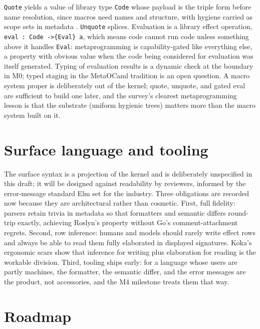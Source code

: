\documentclass[11pt]{article}
\begin{document}
\texttt{Quote} yields a value of library type \texttt{Code} whose payload is the triple form before name resolution, since macros need names and structure, with hygiene carried as scope sets in metadata \cite{flatt2016, kohlbecker1986}. \texttt{Unquote} splices. Evaluation is a library effect operation, \texttt{eval : Code ->\{Eval\} a}, which means code cannot run code unless something above it handles \texttt{Eval}: metaprogramming is capability-gated like everything else, a property with obvious value when the code being considered for evaluation was itself generated. Typing of evaluation results is a dynamic check at the boundary in M0; typed staging in the MetaOCaml tradition is an open question. A macro system proper is deliberately out of the kernel; quote, unquote, and gated eval are sufficient to build one later, and the survey's clearest metaprogramming lesson is that the substrate (uniform hygienic trees) matters more than the macro system built on it.

\section{Surface language and tooling}
\label{sec:tooling}

The surface syntax is a projection of the kernel and is deliberately unspecified in this draft; it will be designed against readability by reviewers, informed by the error-message standard Elm set for the industry. Three obligations are recorded now because they are architectural rather than cosmetic. First, full fidelity: parsers retain trivia in metadata so that formatters and semantic differs round-trip exactly, achieving Roslyn's property without Go's comment-attachment regrets. Second, row inference: humans and models should rarely write effect rows and always be able to read them fully elaborated in displayed signatures. Koka's ergonomic scars show that inference for writing plus elaboration for reading is the workable division. Third, tooling ships early: for a language whose users are partly machines, the formatter, the semantic differ, and the error messages are the product, not accessories, and the M4 milestone treats them that way.

\section{Roadmap}
\label{sec:roadmap}
\end{document}
